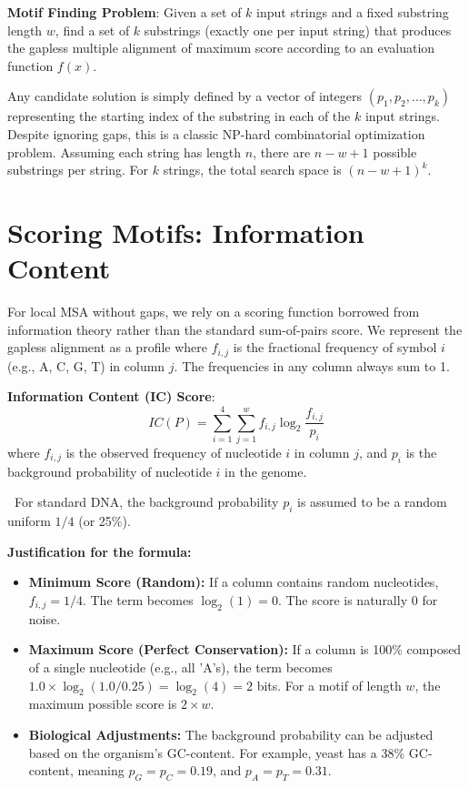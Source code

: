 \documentclass[11pt, a4paper]{article}
\newcommand{\sta}{\textbf{\sffamily [CRITICAL / EXAM]\ }}
\newenvironment{important}
  {\begin{tcolorbox}[colback=blue!5!white, colframe=blue!75!black, arc=1mm, boxrule=1pt]}
  {\end{tcolorbox}}
\begin{document}
\begin{important}
  \textbf{Motif Finding Problem}: Given a set of $k$ input strings and a fixed substring length $w$, find a set of $k$ substrings (exactly one per input string) that produces the gapless multiple alignment of maximum score according to an evaluation function $f(x)$.
\end{important}

Any candidate solution is simply defined by a vector of integers $(p_1, p_2, \dots, p_k)$ representing the starting index of the substring in each of the $k$ input strings.
Despite ignoring gaps, this is a classic NP-hard combinatorial optimization problem. Assuming each string has length $n$, there are $n-w+1$ possible substrings per string. For $k$ strings, the total search space is $(n-w+1)^k$. 

\section{Scoring Motifs: Information Content}

For local MSA without gaps, we rely on a scoring function borrowed from information theory rather than the standard sum-of-pairs score. 
We represent the gapless alignment as a profile where $f_{i,j}$ is the fractional frequency of symbol $i$ (e.g., A, C, G, T) in column $j$. The frequencies in any column always sum to 1.

\begin{important}
  \textbf{Information Content (IC) Score}:
  \[ IC(P) = \sum_{i=1}^{4} \sum_{j=1}^{w} f_{i,j} \log_{2} \frac{f_{i,j}}{p_i} \]
  where $f_{i,j}$ is the observed frequency of nucleotide $i$ in column $j$, and $p_i$ is the background probability of nucleotide $i$ in the genome.
\end{important}

\sta For standard DNA, the background probability $p_i$ is assumed to be a random uniform $1/4$ (or 25\%). 

\textbf{Justification for the formula:}
\begin{itemize}
    \item \textbf{Minimum Score (Random):} If a column contains random nucleotides, $f_{i,j} = 1/4$. The term becomes $\log_2(1) = 0$. The score is naturally $0$ for noise.
    \item \textbf{Maximum Score (Perfect Conservation):} If a column is 100\% composed of a single nucleotide (e.g., all 'A's), the term becomes $1.0 \times \log_2(1.0 / 0.25) = \log_2(4) = 2$ bits. For a motif of length $w$, the maximum possible score is $2 \times w$.
    \item \textbf{Biological Adjustments:} The background probability can be adjusted based on the organism's GC-content. For example, yeast has a 38\% GC-content, meaning $p_G = p_C = 0.19$, and $p_A = p_T = 0.31$.
\end{itemize}
\end{document}
